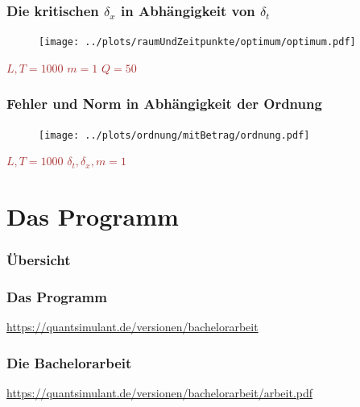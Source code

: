 \documentclass{beamer}
\begin{document}
\begin{frame}
\frametitle{Die kritischen \(\delta_x\) in Abhängigkeit von \(\delta_t\)}
\begin{figure}
	\texttt{[image: ../plots/raumUndZeitpunkte/optimum/optimum.pdf]}
	\label{deltathetaxmin}
\end{figure}
\textcolor{brown}{
\(L,T = 1000\)\hspace{3em} \(m = 1\)\hspace{3em} \(Q = 50\)
}
\end{frame}
\begin{frame}
\frametitle{Fehler und Norm in Abhängigkeit der Ordnung}

\begin{figure}
	\texttt{[image: ../plots/ordnung/mitBetrag/ordnung.pdf]}
	\label{ordnunguebersicht}
\end{figure}
\textcolor{brown}{
\(L, T = 1000\)\hspace{3em} \( \delta_t, \delta_x, m = 1\)}
\end{frame}
\section{Das Programm}
\begin{frame}
\frametitle{Übersicht}
\tableofcontents[currentsection]
\end{frame}
\begin{frame}
\frametitle{Das Programm}
\textcolor{blue}{
\href{https://quantsimulant.de/versionen/bachelorarbeit}{https://quantsimulant.de/versionen/bachelorarbeit}
}
\end{frame}
\begin{frame}
\frametitle{Die Bachelorarbeit}
\textcolor{blue}{
	\href{https://quantsimulant.de/versionen/bachelorarbeit/arbeit.pdf}{https://quantsimulant.de/versionen/bachelorarbeit/arbeit.pdf}
}
\end{frame}
 
\end{document}
